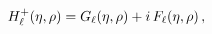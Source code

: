 $\mathop{{H^{+}_{\ell}}\/}\nolimits\!\left(\eta,\rho\right)=\mathop{G_{\ell}\/}%
\nolimits\!\left(\eta,\rho\right)+i\mathop{F_{\ell}\/}\nolimits\!\left(\eta,%
\rho\right),$